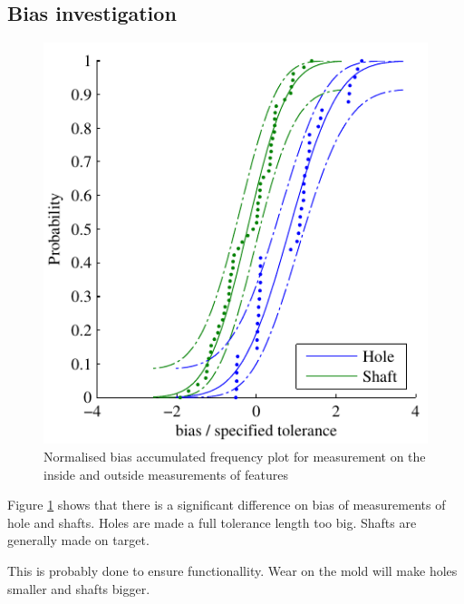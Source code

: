 \documentclass[aip,amsmath, reprint, author-year,nobalancelastpage]{revtex4-1}
\begin{document}
\subsection{Bias investigation}
\begin{figure}[H]
\includegraphics{CA_inside.pdf}
\caption{\label{fig:CA_inside} Normalised bias accumulated frequency plot for measurement on the inside and outside measurements of features}
\end{figure}

Figure \ref{fig:CA_inside} shows that there is a significant difference on bias of measurements of hole and shafts. Holes are made a full tolerance length too big. Shafts are generally made on target.

This is probably done to ensure functionallity. Wear on the mold will make holes smaller and shafts bigger. 


\newpage
\end{document}

